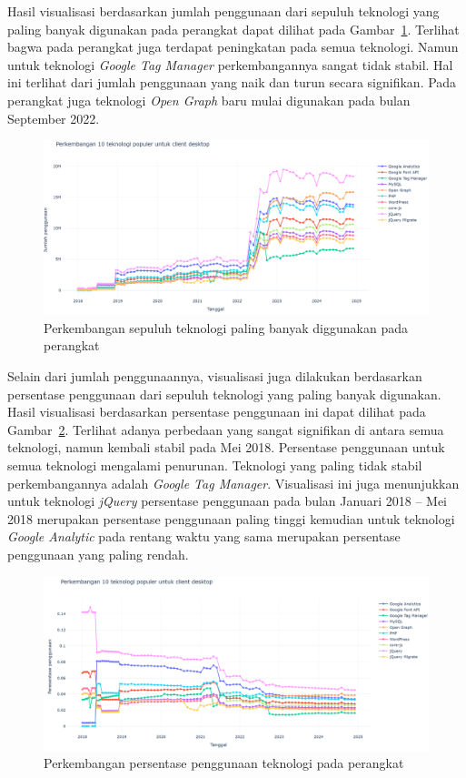 Hasil visualisasi berdasarkan jumlah penggunaan dari sepuluh teknologi yang paling banyak digunakan pada perangkat \desktop dapat dilihat pada Gambar~\ref{fig:sepuluhdesktopreal}. Terlihat bagwa pada perangkat \desktop juga terdapat peningkatan pada semua teknologi. Namun untuk teknologi \textit{Google Tag Manager} perkembangannya sangat tidak stabil. Hal ini terlihat dari jumlah penggunaan yang naik dan turun secara signifikan. Pada perangkat \desktop juga teknologi \textit{Open Graph} baru mulai digunakan pada bulan September 2022.

\begin{figure}[H]
    \centering
    \includegraphics[width=0.7\linewidth]{Gambar/Perkembangan desktop real.png}
    \caption{Perkembangan sepuluh teknologi paling banyak diggunakan pada perangkat \desktop}
    \label{fig:sepuluhdesktopreal}
\end{figure}

Selain dari jumlah penggunaannya, visualisasi juga dilakukan berdasarkan persentase penggunaan dari sepuluh teknologi yang paling banyak digunakan. Hasil visualisasi berdasarkan persentase penggunaan ini dapat dilihat pada Gambar~\ref{fig:persentasedesktopreal}. Terlihat adanya perbedaan yang sangat signifikan di antara semua teknologi, namun kembali stabil pada Mei 2018. Persentase penggunaan untuk semua teknologi mengalami penurunan. Teknologi yang paling tidak stabil perkembangannya adalah \textit{Google Tag Manager}. Visualisasi ini juga menunjukkan untuk teknologi \textit{jQuery} persentase penggunaan pada bulan Januari 2018 -- Mei 2018 merupakan persentase penggunaan paling tinggi kemudian untuk teknologi \textit{Google Analytic} pada rentang waktu yang sama merupakan persentase penggunaan yang paling rendah.

\begin{figure}[H]
    \centering
    \includegraphics[width=0.7\linewidth]{Gambar/Perkembangan persentase desktop real.png}
    \caption{Perkembangan persentase penggunaan teknologi pada perangkat \desktop }
    \label{fig:persentasedesktopreal}
\end{figure}

